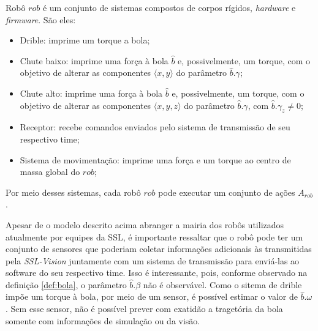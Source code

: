 \begin{defi}[Robô]
  Robô $rob$ é um conjunto de sistemas compostos de corpos rígidos,
  \textit{hardware} e \textit{firmware}. São eles:

  \begin{itemize}
    \item Drible: imprime um torque a bola;
    \item Chute baixo: imprime uma força à bola $\hat{b}$
          e, possivelmente, um torque, com o objetivo de
          alterar as componentes $\langle x,y \rangle$
          do parâmetro $\hat{b}.\gamma$;
    \item Chute alto: imprime uma força à bola $\hat{b}$
          e, possivelmente, um torque, com o objetivo de
          alterar as componentes $\langle x,y,z \rangle$
          do parâmetro $\hat{b}.\gamma$, com $\hat{b}.\gamma_z \neq 0$;
    \item Receptor: recebe comandos enviados pelo sistema de
          transmissão de seu respectivo time;
    \item Sistema de movimentação: imprime uma força e um torque
          ao centro de massa global do $rob$;
  \end{itemize}

  Por meio desses sistemas, cada robô $rob$ pode executar um conjunto de ações $A_{rob}$.

  Apesar de o modelo descrito acima abranger a mairia dos
  robôs utilizados atualmente por equipes da SSL, é importante
  ressaltar que o robô pode ter um conjunto de sensores que
  poderiam coletar informações adicionais às transmitidas pela
  \textit{SSL-Vision} juntamente com um sistema de transmissão
  para enviá-las ao software do seu respectivo time. Isso é
  interessante, pois, conforme observado na definição \ref{def:bola},
  o parâmetro $\hat{b}.\beta$ não é observável. Como o sitema de
  drible impõe um torque à bola, por meio de um sensor, é possível
  estimar o valor de $\hat{b}.\omega$. Sem esse sensor, não é possível
  prever com exatidão a tragetória da bola somente com informações de
  simulação ou da visão.

\end{defi}

